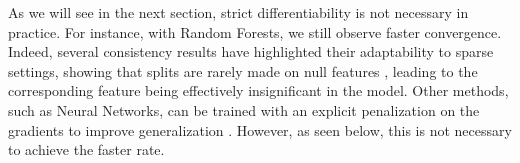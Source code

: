 \documentclass{article}
\theoremstyle{plain}
\theoremstyle{definition}
\theoremstyle{remark}
\begin{document}
%
%
As we will see in the next section, strict differentiability is not necessary in practice. For instance, with Random Forests, we still observe faster convergence. Indeed, several consistency results have highlighted their adaptability to sparse settings, showing that splits are rarely made on null features \cite{Scornet_2015ConsistencyRF, pmlr-v130-klusowski21b}, leading to the corresponding feature being effectively insignificant in the model.
Other methods, such as Neural Networks, can be trained with an explicit penalization on the gradients to improve generalization \cite{zhao2022penalizing}. However, as seen below, this is not necessary to achieve the faster rate.
%
\end{document}
